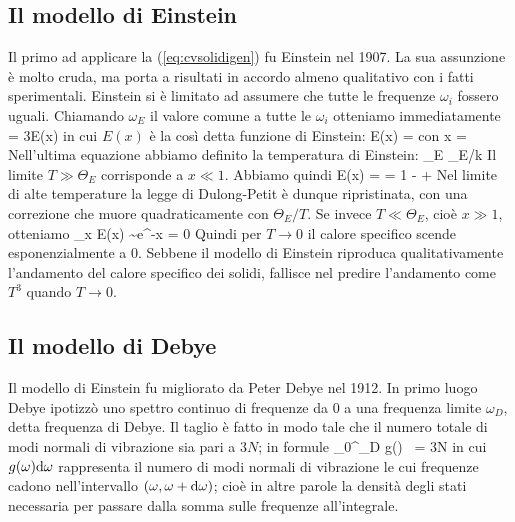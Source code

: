 \subsection{Il modello di Einstein}
Il primo ad applicare la (\ref{eq:cvsolidigen}) fu Einstein nel 1907. La sua assunzione è molto cruda, ma porta a risultati in accordo almeno qualitativo con i fatti sperimentali. Einstein si è limitato ad assumere che tutte le frequenze $\omega_i$ fossero uguali. Chiamando $\omega_E$ il valore comune a tutte le $\omega_i$ otteniamo immediatamente
\be
{} = 3E(x)
\ee
in cui $E(x)$ è la così detta funzione di Einstein:
\be
\label{eq:feinsteincv}
E(x) = 
\ee
con
\be
x =  \equiv {}
\ee
Nell'ultima equazione abbiamo definito la temperatura di Einstein:
\be
\Theta_E \equiv \hbar\omega_E/k
\ee
Il limite $T \gg \Theta_E$ corrisponde a $x \ll 1$. Abbiamo quindi
\be
E(x) =  = 1 -  + \cdots
\ee
Nel limite di alte temperature la legge di Dulong-Petit è dunque ripristinata, con una correzione che muore quadraticamente con $\Theta_E/T$. Se invece $T \ll \Theta_E$, cioè $x \gg 1$, otteniamo
\be
\lim_{x\to \infty} E(x) \sim e^{-x} = 0
\ee
Quindi per $T\to 0$ il calore specifico scende esponenzialmente a 0. Sebbene il modello di Einstein riproduca qualitativamente l'andamento del calore specifico dei solidi, fallisce nel 
predire l'andamento come $T^3$ quando $T\to 0$.

\subsection{Il modello di Debye}
Il modello di Einstein fu migliorato da Peter Debye nel 1912. In primo luogo Debye ipotizzò uno spettro continuo di frequenze da $0$ a una frequenza limite $\omega_D$, detta frequenza di Debye. Il taglio è fatto in modo tale che il numero totale di modi normali di vibrazione sia pari a $3N$; in formule
\be
\int_0^{\omega_D} g(\omega) \, \de{\omega} = 3N
\ee
in cui $g(\omega){\textrm d}\omega$ rappresenta il numero di modi normali di vibrazione le cui frequenze cadono nell'intervallo $(\omega, \omega+{\textrm d}\omega)$; cioè in altre parole la densità degli stati necessaria per passare dalla somma sulle frequenze all'integrale.

